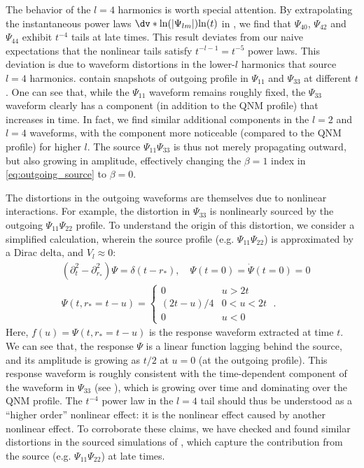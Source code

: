 The behavior of the $l=4$ harmonics is worth special attention.
By extrapolating the instantaneous power laws $\dv*{\ln(|\Psi_{lm}|)}{\ln(t)}$ in , we find that $\Psi_{40}$, $\Psi_{42}$ and $\Psi_{44}$ exhibit $t^{-4}$ tails at late times.
This result deviates from our naive expectations that the nonlinear tails satisfy $t^{-l-1} = t^{-5}$ power laws.
This deviation is due to waveform distortions in the lower-$l$ harmonics that source $l=4$ harmonics.
 contain snapshots of outgoing profile in $\Psi_{11}$ and $\Psi_{33}$ at different $t$.
One can see that, while the $\Psi_{11}$ waveform remains roughly fixed, the $\Psi_{33}$ waveform clearly has a component (in addition to the QNM profile) that increases in time.
In fact, we find similar additional components in the $l=2$ and $l=4$ waveforms, with the component more noticeable (compared to the QNM profile) for higher $l$.
The source $\Psi_{11} \Psi_{33}$ is thus not merely propagating outward, but also growing in amplitude, effectively changing the $\beta = 1$ index in \eqref{eq:outgoing_source} to $\beta=0$.

The distortions in the outgoing waveforms are themselves due to nonlinear interactions.
For example, the distortion in $\Psi_{33}$ is nonlinearly sourced by the outgoing $\Psi_{11} \Psi_{22}$ profile.
To understand the origin of this distortion, we consider a simplified calculation, wherein the source profile (e.g. $\Psi_{11} \Psi_{22}$) is approximated by a Dirac delta, and $V_l \approx 0$:
\begin{align}
  & (\partial_t^2 -  \partial_{r_*}^2) \Psi =  \delta(t-r_*),\quad
    \Psi(t=0) = \dot{\Psi}(t=0) = 0 \nonumber \\
    & \Psi(t,r_* = t-u) =
    \begin{cases}
      0 & u > 2t \\
      (2t-u) / 4 & 0 < u < 2t \\
      0 & u < 0
    \end{cases}
    \;.
\end{align}
Here, $f(u) = \Psi(t, r_* = t-u)$ is the response waveform extracted at time $t$.
We can see that, the response $\Psi$ is a linear function lagging behind the source, and its amplitude is growing as $t/2$ at $u = 0$ (at the outgoing profile).
This response waveform is roughly consistent with the time-dependent component of the waveform in $\Psi_{33}$ (see ), which is growing over time and dominating over the QNM profile.
The $t^{-4}$ power law in the $l=4$ tail should thus be understood as a ``higher order'' nonlinear effect: it is the nonlinear effect caused by another nonlinear effect.
To corroborate these claims, we have checked and found similar distortions in the sourced simulations of , which capture the contribution from the source (e.g. $\Psi_{11}\Psi_{22}$) at late times.



